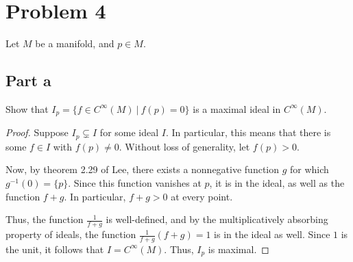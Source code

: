 \documentclass[fontsize=11pt]{scrartcl} %
\numberwithin{equation}{section} %
\numberwithin{figure}{section} %
\numberwithin{table}{section} %
\begin{document}
\section*{Problem 4}
Let $M$ be a manifold, and $p\in M$.
\subsection*{Part a}
Show that $I_p = \{f\in C^{\infty}(M)\ |\ f(p)=0\}$ is a maximal ideal in $C^{\infty}(M)$.
\\
\begin{proof}
Suppose $I_p\subsetneq I$ for some ideal $I$. In particular, this means that
    there is some $f\in I$ with $f(p)\neq 0$. Without loss of generality, let
    $f(p)>0$.

    Now, by theorem 2.29 of Lee, there exists a nonnegative function $g$ for which
    $g^{-1}(0)=\{p\}$. Since this function vanishes at $p$, it is in the
    ideal, as well as the function $f+g$. In particular, $f+g > 0$ at every
    point.

    Thus, the function $\frac{1}{f+g}$ is well-defined, and by the
    multiplicatively absorbing property of ideals, the function
    $\frac{1}{f+g}(f+g) = 1$ is in the ideal as well. Since $1$ is the unit,
    it follows that $I=C^{\infty}(M)$. Thus, $I_p$ is maximal.
\end{proof}
\end{document}
